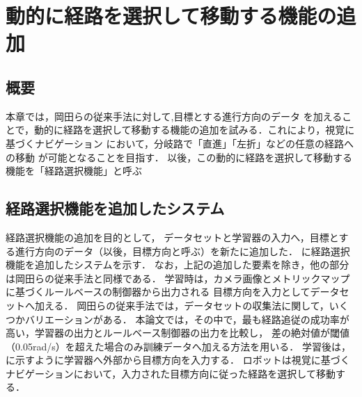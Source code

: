 \chapter{動的に経路を選択して移動する機能の追加}
\label{chap:path_select}

\section{概要}
本章では，岡田らの従来手法に対して,目標とする進行方向のデータ
を加えることで，動的に経路を選択して移動する機能の追加を試みる．これにより，視覚に基づくナビゲーション
において，分岐路で「直進」「左折」などの任意の経路への移動
が可能となることを目指す．
以後，この動的に経路を選択して移動する機能を「経路選択機能」と呼ぶ
% 
% 
% 

\section{経路選択機能を追加したシステム}
経路選択機能の追加を目的として，
データセットと学習器の入力へ，目標とする進行方向のデータ（以後，目標方向と呼ぶ）を新たに追加した．
に経路選択機能を追加したシステムを示す．
なお，上記の追加した要素を除き，他の部分は岡田らの従来手法と同様である．
学習時は，カメラ画像とメトリックマップに基づくルールベースの制御器から出力される
目標方向を入力としてデータセットへ加える．
岡田らの従来手法では，データセットの収集法に関して，いくつかバリエーションがある．
本論文では，その中で，最も経路追従の成功率が高い，学習器の出力とルールベース制御器の出力を比較し，
差の絶対値が閾値（0.05rad/s）を超えた場合のみ訓練データへ加える方法\cite{okada2021}を用いる．
学習後は，に示すように学習器へ外部から目標方向を入力する．
ロボットは視覚に基づくナビゲーションにおいて，入力された目標方向に従った経路を選択して移動する．

